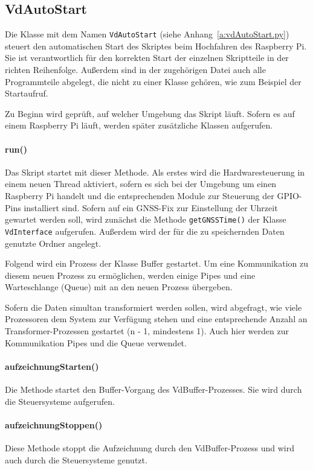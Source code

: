 \documentclass[a4paper,12pt,bibliography=totoc, listof=totoc,titlepage,pointlessnumbers]{scrreprt}
\newcommand{\code}[1]{\texttt{#1}}
\begin{document}
\subsection{VdAutoStart}
Die Klasse mit dem Namen \code{VdAutoStart} (siehe Anhang~\ref{a:vdAutoStart.py}) steuert den automatischen Start des Skriptes beim Hochfahren des Raspberry Pi. Sie ist verantwortlich für den korrekten Start der einzelnen Skriptteile in der richten Reihenfolge. Außerdem sind in der zugehörigen Datei auch alle Programmteile abgelegt, die nicht zu einer Klasse gehören, wie zum Beispiel der Startaufruf.

Zu Beginn wird geprüft, auf welcher Umgebung das Skript läuft. Sofern es auf einem Raspberry Pi läuft, werden später zusätzliche Klassen aufgerufen.

\paragraph{run()}
Das Skript startet mit dieser Methode. Als erstes wird die Hardwaresteuerung in einem neuen Thread aktiviert, sofern es sich bei der Umgebung um einen Raspberry Pi handelt und die entsprechenden Module zur Steuerung der GPIO-Pins installiert sind. Sofern auf ein GNSS-Fix zur Einstellung der Uhrzeit gewartet werden soll, wird zunächst die Methode \code{getGNSSTime()} der Klasse \code{VdInterface} aufgerufen. Außerdem wird der für die zu speichernden Daten genutzte Ordner angelegt.

Folgend wird ein Prozess der Klasse Buffer gestartet. Um eine Kommunikation zu diesem neuen Prozess zu ermöglichen, werden einige Pipes und eine Warteschlange (Queue) mit an den neuen Prozess übergeben.

Sofern die Daten simultan transformiert werden sollen, wird abgefragt, wie viele Prozessoren dem System zur Verfügung stehen und eine entsprechende Anzahl an Transformer-Prozessen gestartet (n - 1, mindestens 1). Auch hier werden zur Kommunikation Pipes und die Queue verwendet.

\paragraph{aufzeichnungStarten()}
Die Methode startet den Buffer-Vorgang des VdBuffer-Prozesses. Sie wird durch die Steuersysteme aufgerufen.

\paragraph{aufzeichnungStoppen()}
Diese Methode stoppt die Aufzeichnung durch den VdBuffer-Prozess und wird auch durch die Steuersysteme genutzt.
\end{document}
